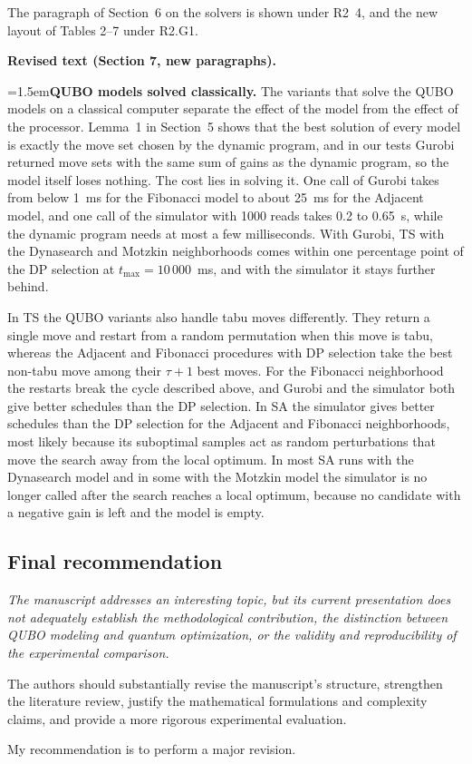 \documentclass[12pt]{article}
\newenvironment{lead}{\par\medskip\noindent\itshape\renewcommand{\emph}[1]{\textbf{##1}}\ignorespaces}{\par}
\newcommand{\change}[3]{\par\smallskip\noindent\textbf{Revised text (#1).}\par
  {\leftskip=1.5em\noindent#3\par}}
\begin{document}
The paragraph of Section~6 on the solvers is shown under R2~4, and the new layout of Tables 2--7 under R2.G1.
\change{Section 7, new paragraphs}{\textit{(no counterpart in the original manuscript)}}{\textbf{QUBO models solved classically.} The variants that solve the QUBO models on a classical computer separate the effect of the model from the effect of the processor. Lemma~1 in Section~5 shows that the best solution of every model is exactly the move set chosen by the dynamic program, and in our tests Gurobi returned move sets with the same sum of gains as the dynamic program, so the model itself loses nothing. The cost lies in solving it. One call of Gurobi takes from below 1~ms for the Fibonacci model to about 25~ms for the Adjacent model, and one call of the simulator with 1000 reads takes 0.2 to 0.65~s, while the dynamic program needs at most a few milliseconds. With Gurobi, TS with the Dynasearch and Motzkin neighborhoods comes within one percentage point of the DP selection at $t_{\max}=10\,000$~ms, and with the simulator it stays further behind.

In TS the QUBO variants also handle tabu moves differently. They return a single move and restart from a random permutation when this move is tabu, whereas the Adjacent and Fibonacci procedures with DP selection take the best non-tabu move among their $\tau+1$ best moves. For the Fibonacci neighborhood the restarts break the cycle described above, and Gurobi and the simulator both give better schedules than the DP selection. In SA the simulator gives better schedules than the DP selection for the Adjacent and Fibonacci neighborhoods, most likely because its suboptimal samples act as random perturbations that move the search away from the local optimum. In most SA runs with the Dynasearch model and in some with the Motzkin model the simulator is no longer called after the search reaches a local optimum, because no candidate with a negative gain is left and the model is empty.}

\subsection*{Final recommendation}

\begin{lead}
The manuscript addresses an interesting topic, but its current presentation does not adequately establish the methodological contribution, the distinction between QUBO modeling and quantum optimization, or the validity and reproducibility of the experimental comparison.

The authors should substantially revise the manuscript's structure, strengthen the literature review, justify the mathematical formulations and complexity claims, and provide a more rigorous experimental evaluation.

My recommendation is to perform a major revision.
\end{lead}
\end{document}
